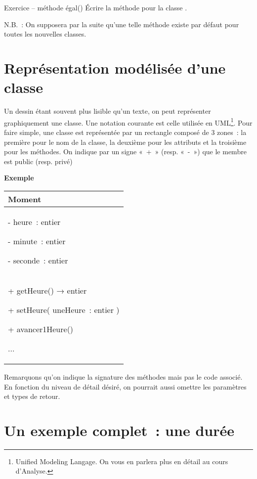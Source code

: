 	\begin{Emphase}{Exercice – méthode égal()}
		Écrire la méthode  pour la classe .
		
		N.B.~: On supposera par la suite qu'une telle méthode
		existe par défaut pour toutes les nouvelles classes.
	\end{Emphase}

\section{Représentation modélisée d'une classe}

	Un dessin étant souvent plus lisible qu'un texte, on
	peut représenter graphiquement une classe. Une notation courante est
	celle utilisée en UML\footnote{{Unified
	Modeling Langage. }On vous en parlera plus en détail au cours
	d'Analyse.}. Pour faire simple, une classe est
	représentée par un rectangle composé de 3 zones~: la première pour le
	nom de la classe, la deuxième pour les attributs et la troisième pour
	les méthodes. On indique par un signe «~+~» (resp. «~-~») que le membre
	est public (resp. privé)

	\textbf{Exemple}
	
	\begin{center}
	\begin{tabular}{|m{7cm}|}
	\hline
	\centering\arraybslash \bfseries Moment\\\hline
	{ {}- heure~: entier}
	
	{ {}- minute~: entier}
	
	 {}- seconde~: entier\\\hline
	{ + getHeure() \textsf{→} entier}
	
	{ + setHeure( uneHeure~: entier )}
	
	{ + avancer1Heure()}
	
	 ...\\\hline
	\end{tabular}
	\end{center}

	Remarquons qu'on indique la signature des méthodes mais
	pas le code associé. En fonction du niveau de détail désiré, on
	pourrait aussi omettre les paramètres et types de retour.

\section{Un exemple complet~: une durée}

